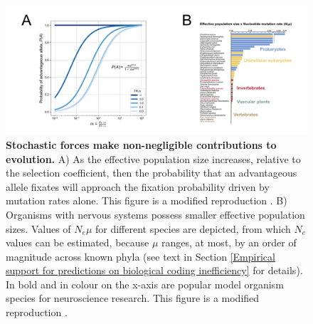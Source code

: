 \documentclass[twocolumn]{article}
\begin{document}
\begin{figure}[htp]
\centering
\includegraphics[width=16.5 cm]{fig_2.png}
\caption{\textbf{Stochastic forces make non-negligible contributions to evolution.} A) As the effective population size increases, relative to the selection coefficient, then the probability that an advantageous allele fixates will approach the fixation probability driven by mutation rates alone. This figure is a modified reproduction \cite{Lynch_2007}. B) Organisms with nervous systems possess smaller effective population sizes. Values of $N_e\mu$ for different species are depicted, from which $N_e$ values can be estimated, because $\mu$ ranges, at most, by an order of magnitude across known phyla (see text in Section \ref{Empirical support for predictions on biological coding inefficiency} for details). In bold and in colour on the x-axis are popular model organism species for neuroscience research. This figure is a modified reproduction \cite{Lynch_Conery_2003}.}
\label{fig_neutralforces}
\end{figure}
\end{document}
